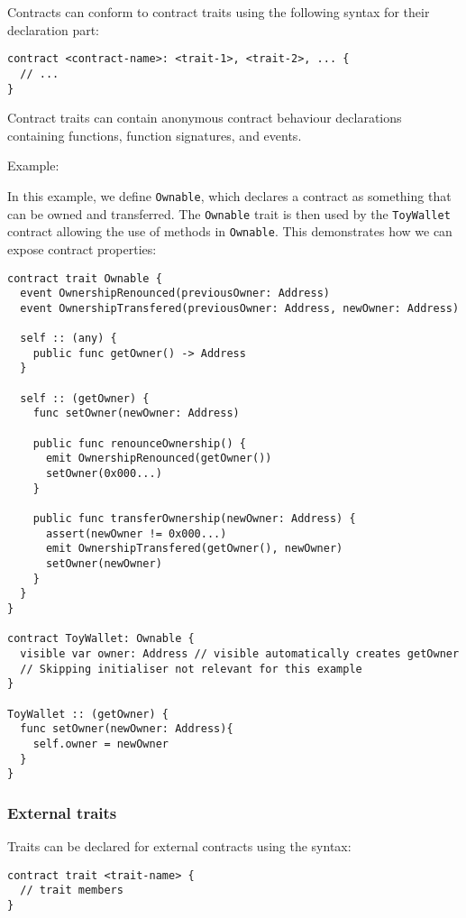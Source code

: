 Contracts can conform to contract traits using the following syntax for their declaration part:

\begin{verbatim}
contract <contract-name>: <trait-1>, <trait-2>, ... {
  // ...
}
\end{verbatim}

Contract traits can contain anonymous contract behaviour declarations containing functions, function signatures, and events.

Example:

In this example, we define \texttt{Ownable}, which declares a contract as something that can be owned and transferred. The \texttt{Ownable} trait is then used by the \texttt{ToyWallet} contract allowing the use of methods in \texttt{Ownable}. This demonstrates how we can expose contract properties:

\begin{verbatim}
contract trait Ownable {
  event OwnershipRenounced(previousOwner: Address)
  event OwnershipTransfered(previousOwner: Address, newOwner: Address)

  self :: (any) {
    public func getOwner() -> Address
  }

  self :: (getOwner) {
    func setOwner(newOwner: Address)

    public func renounceOwnership() {
      emit OwnershipRenounced(getOwner())
      setOwner(0x000...)
    }

    public func transferOwnership(newOwner: Address) {
      assert(newOwner != 0x000...)
      emit OwnershipTransfered(getOwner(), newOwner)
      setOwner(newOwner)
    }
  }
}

contract ToyWallet: Ownable {
  visible var owner: Address // visible automatically creates getOwner
  // Skipping initialiser not relevant for this example
}

ToyWallet :: (getOwner) {
  func setOwner(newOwner: Address){
    self.owner = newOwner
  }
}
\end{verbatim}

\subsubsection{External traits}
\label{sec:appendix-b-external-traits}

Traits can be declared for external contracts using the syntax:

\begin{verbatim}
contract trait <trait-name> {
  // trait members
}
\end{verbatim}

